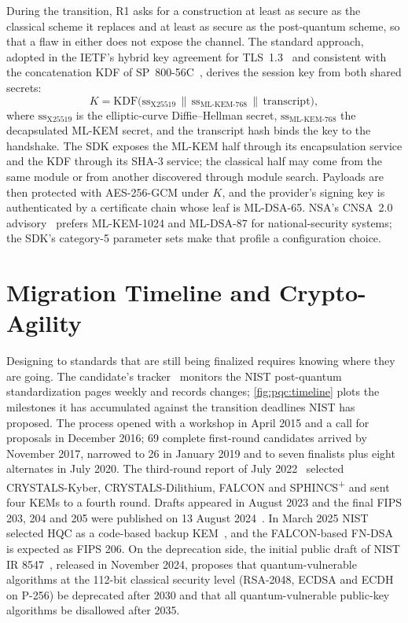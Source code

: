 During the transition, R1 asks for a construction at least as secure as the classical scheme it replaces and at least as secure as the post-quantum scheme, so that a flaw in either does not expose the channel. The standard approach, adopted in the IETF's hybrid key agreement for TLS~1.3~\cite{kwiatkowski2025hybridtls} and consistent with the concatenation KDF of SP~800-56C~\cite{nist2020sp80056c}, derives the session key from both shared secrets:
\begin{equation}\label{eq:pqc:hybrid}
K = \mathrm{KDF}\bigl(\mathrm{ss}_{\text{X25519}} \,\|\, \mathrm{ss}_{\text{ML-KEM-768}} \,\|\, \mathrm{transcript}\bigr),
\end{equation}
where $\mathrm{ss}_{\text{X25519}}$ is the elliptic-curve Diffie--Hellman secret, $\mathrm{ss}_{\text{ML-KEM-768}}$ the decapsulated ML-KEM secret, and the transcript hash binds the key to the handshake. The SDK exposes the ML-KEM half through its encapsulation service and the KDF through its SHA-3 service; the classical half may come from the same module or from another discovered through module search. Payloads are then protected with AES-256-GCM under $K$, and the provider's signing key is authenticated by a certificate chain whose leaf is ML-DSA-65. NSA's CNSA~2.0 advisory~\cite{nsa2022cnsa2} prefers ML-KEM-1024 and ML-DSA-87 for national-security systems; the SDK's category-5 parameter sets make that profile a configuration choice.

\section{Migration Timeline and Crypto-Agility}\label{sec:pqc:timeline}

Designing to standards that are still being finalized requires knowing where they are going. The candidate's tracker~\cite{guo2026nisttracker} monitors the NIST post-quantum standardization pages weekly and records changes; \cref{fig:pqc:timeline} plots the milestones it has accumulated against the transition deadlines NIST has proposed. The process opened with a workshop in April 2015 and a call for proposals in December 2016; 69 complete first-round candidates arrived by November 2017, narrowed to 26 in January 2019 and to seven finalists plus eight alternates in July 2020. The third-round report of July 2022~\cite{nist2022ir8413} selected CRYSTALS-Kyber, CRYSTALS-Dilithium, FALCON and SPHINCS\textsuperscript{+} and sent four KEMs to a fourth round. Drafts appeared in August 2023 and the final FIPS 203, 204 and 205 were published on 13 August 2024~\cite{nist2024fips203,nist2024fips204,nist2024fips205}. In March 2025 NIST selected HQC as a code-based backup KEM~\cite{nist2025ir8545}, and the FALCON-based FN-DSA is expected as FIPS 206. On the deprecation side, the initial public draft of NIST IR 8547~\cite{nist2024ir8547}, released in November 2024, proposes that quantum-vulnerable algorithms at the 112-bit classical security level (RSA-2048, ECDSA and ECDH on P-256) be deprecated after 2030 and that all quantum-vulnerable public-key algorithms be disallowed after 2035.

